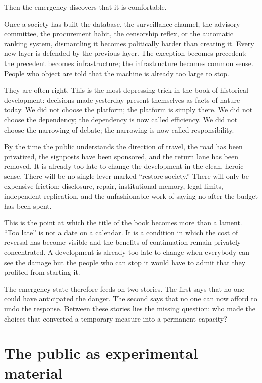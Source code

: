﻿\documentclass[12pt,a4paper]{book}
\begin{document}
Then the emergency discovers that it is comfortable.

Once a society has built the database, the surveillance channel, the advisory
committee, the procurement habit, the censorship reflex, or the automatic
ranking system, dismantling it becomes politically harder than creating it.
Every new layer is defended by the previous layer. The exception becomes
precedent; the precedent becomes infrastructure; the infrastructure becomes
common sense. People who object are told that the machine is already too large
to stop.

They are often right. This is the most depressing trick in the book of
historical development: decisions made yesterday present themselves as facts
of nature today. We did not choose the platform; the platform is simply there.
We did not choose the dependency; the dependency is now called efficiency.
We did not choose the narrowing of debate; the narrowing is now called
responsibility.

By the time the public understands the direction of travel, the road has been
privatized, the signposts have been sponsored, and the return lane has been
removed. It is already too late to change the development in the clean,
heroic sense. There will be no single lever marked ``restore society.'' There
will only be expensive friction: disclosure, repair, institutional memory,
legal limits, independent replication, and the unfashionable work of saying
no after the budget has been spent.

This is the point at which the title of the book becomes more than a lament.
``Too late'' is not a date on a calendar. It is a condition in which the cost
of reversal has become visible and the benefits of continuation remain
privately concentrated. A development is already too late to change when
everybody can see the damage but the people who can stop it would have to
admit that they profited from starting it.

The emergency state therefore feeds on two stories. The first says that no
one could have anticipated the danger. The second says that no one can now
afford to undo the response. Between these stories lies the missing question:
who made the choices that converted a temporary measure into a permanent
capacity?

\section{The public as experimental material}
\end{document}
